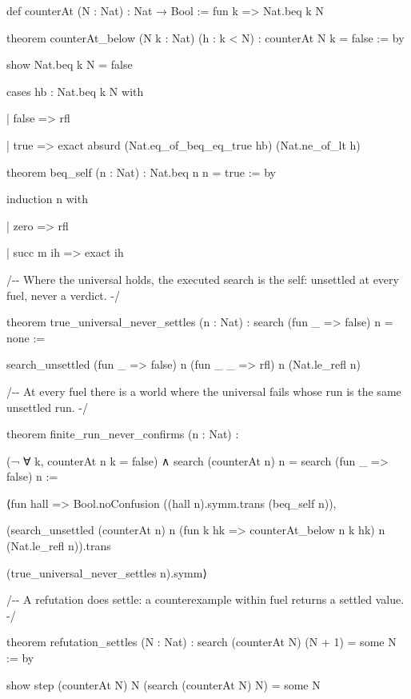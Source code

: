 \documentclass[10pt,twocolumn]{article}
\newenvironment{Shaded}{}{}
\newcommand{\NormalTok}[1]{#1}
\providecommand{\NormalTok}[1]{#1}
\providecommand{\NormalTok}[1]{#1}
\begin{document}
\begin{strip}
\begin{Shaded}
\begin{Highlighting}[]
\NormalTok{def counterAt (N : Nat) : Nat → Bool := fun k =\textgreater{} Nat.beq k N}

\NormalTok{theorem counterAt\_below (N k : Nat) (h : k \textless{} N) : counterAt N k = false := by}

\NormalTok{  show Nat.beq k N = false}

\NormalTok{  cases hb : Nat.beq k N with}

\NormalTok{  | false =\textgreater{} rfl}

\NormalTok{  | true =\textgreater{} exact absurd (Nat.eq\_of\_beq\_eq\_true hb) (Nat.ne\_of\_lt h)}

\NormalTok{theorem beq\_self (n : Nat) : Nat.beq n n = true := by}

\NormalTok{  induction n with}

\NormalTok{  | zero =\textgreater{} rfl}

\NormalTok{  | succ m ih =\textgreater{} exact ih}

\NormalTok{/{-}{-} Where the universal holds, the executed search is the self: unsettled at every fuel, never a verdict. {-}/}

\NormalTok{theorem true\_universal\_never\_settles (n : Nat) : search (fun \_ =\textgreater{} false) n = none :=}

\NormalTok{  search\_unsettled (fun \_ =\textgreater{} false) n (fun \_ \_ =\textgreater{} rfl) n (Nat.le\_refl n)}

\NormalTok{/{-}{-} At every fuel there is a world where the universal fails whose run is the same unsettled run. {-}/}

\NormalTok{theorem finite\_run\_never\_confirms (n : Nat) :}

\NormalTok{    (¬ ∀ k, counterAt n k = false) ∧ search (counterAt n) n = search (fun \_ =\textgreater{} false) n :=}

\NormalTok{  ⟨fun hall =\textgreater{} Bool.noConfusion ((hall n).symm.trans (beq\_self n)),}

\NormalTok{   (search\_unsettled (counterAt n) n (fun k hk =\textgreater{} counterAt\_below n k hk) n (Nat.le\_refl n)).trans}

\NormalTok{     (true\_universal\_never\_settles n).symm⟩}

\NormalTok{/{-}{-} A refutation does settle: a counterexample within fuel returns a settled value. {-}/}

\NormalTok{theorem refutation\_settles (N : Nat) : search (counterAt N) (N + 1) = some N := by}

\NormalTok{  show step (counterAt N) N (search (counterAt N) N) = some N}


\end{Highlighting}
\end{Shaded}
\end{strip}
\end{document}

